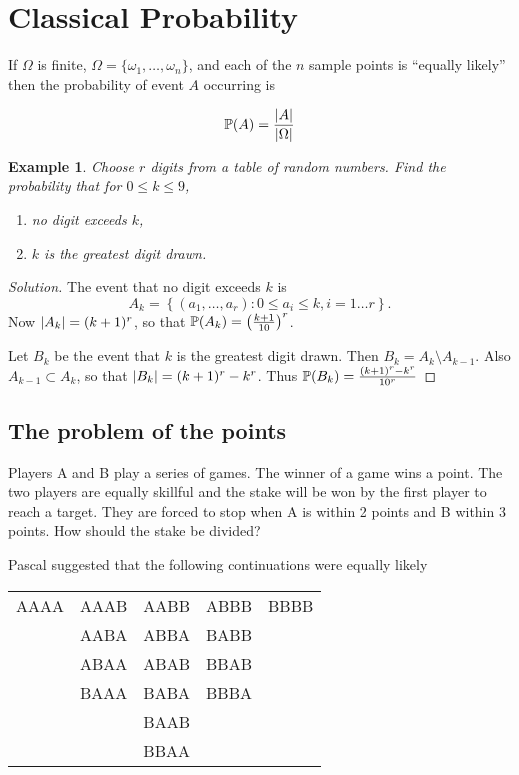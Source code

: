 \documentclass{notes}
\theoremstyle{plain}
\newtheorem*{example}{Example}
\newcommand{\bP}{\mathbb{P}}
\newcommand{\prob}[1]{\bP \negthinspace\left(#1\right)}
\begin{document}
\section{Classical Probability}

If $\Omega$ is finite, $\Omega = \{ \omega_1, \dots, \omega_n \}$, and each
of the $n$ sample points is ``equally likely'' then the probability of event
$A$ occurring is

\[
\prob{A} = \frac{\abs{A}}{\abs{\Omega}}
\]

\begin{example}
Choose $r$ digits from a table of random numbers.  Find the probability that
for $0 \le k \le 9$,
\begin{enumerate}
\item no digit exceeds $k$,
\item $k$ is the greatest digit drawn.
\end{enumerate}
\end{example}

\begin{proof}[Solution]
The event that no digit exceeds $k$ is
\[
A_k = \left\{
(a_1, \dots, a_r) : 0 \le a_i \le k, i=1 \dots r
\right\}.
\]
Now $\left|A_k\right| = (k+1)^r$, so that $\prob{A_k} = \left( \tfrac{k+1}{10}
\right)^r$.

Let $B_k$ be the event that $k$ is the greatest digit drawn.  Then
$B_k = A_k \setminus A_{k-1}$.  Also $A_{k-1} \subset A_k$, so that
$\left|B_k\right| = (k+1)^r - k^r$.  Thus $\prob{B_k} = \tfrac{(k+1)^r - k^r}{10^r}$
\end{proof}

\subsection*{The problem of the points}

Players A and B play a series of games.  The winner of a game wins a point.
The two players are equally skillful and the stake will be won by the first
player to reach a target.  They are forced to stop when A is within 2 points
and B within 3 points.  How should the stake be divided?

Pascal suggested that the following continuations were equally likely

\begin{center}
\ttfamily
\begin{tabular}{c c c c c}
AAAA & AAAB & AABB & ABBB & BBBB \\
     & AABA & ABBA & BABB &      \\
     & ABAA & ABAB & BBAB &      \\
     & BAAA & BABA & BBBA &      \\
     &      & BAAB &      &      \\
     &      & BBAA &      &      
\end{tabular}
\end{center}
\end{document}
